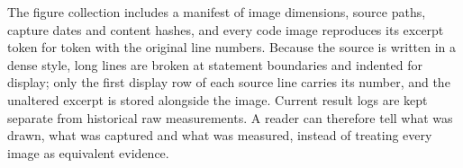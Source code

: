 The figure collection includes a manifest of image dimensions, source paths, capture dates and content hashes, and every code image reproduces its excerpt token for token with the original line numbers. Because the source is written in a dense style, long lines are broken at statement boundaries and indented for display; only the first display row of each source line carries its number, and the unaltered excerpt is stored alongside the image. Current result logs are kept separate from historical raw measurements. A reader can therefore tell what was drawn, what was captured and what was measured, instead of treating every image as equivalent evidence.
